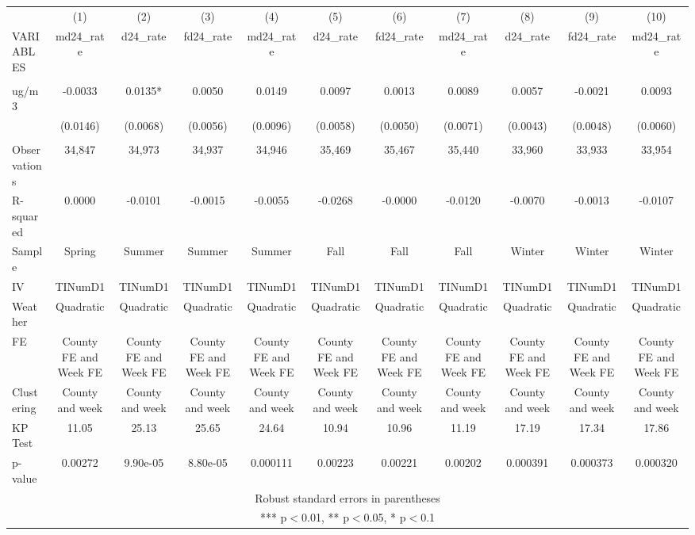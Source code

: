 \begin{tabular}{lcccccccccc} \hline
 & (1) & (2) & (3) & (4) & (5) & (6) & (7) & (8) & (9) & (10) \\
VARIABLES & md24\_rate & d24\_rate & fd24\_rate & md24\_rate & d24\_rate & fd24\_rate & md24\_rate & d24\_rate & fd24\_rate & md24\_rate \\ \hline
 &  &  &  &  &  &  &  &  &  &  \\
ug/m3 & -0.0033 & 0.0135* & 0.0050 & 0.0149 & 0.0097 & 0.0013 & 0.0089 & 0.0057 & -0.0021 & 0.0093 \\
 & (0.0146) & (0.0068) & (0.0056) & (0.0096) & (0.0058) & (0.0050) & (0.0071) & (0.0043) & (0.0048) & (0.0060) \\
 &  &  &  &  &  &  &  &  &  &  \\
Observations & 34,847 & 34,973 & 34,937 & 34,946 & 35,469 & 35,467 & 35,440 & 33,960 & 33,933 & 33,954 \\
R-squared & 0.0000 & -0.0101 & -0.0015 & -0.0055 & -0.0268 & -0.0000 & -0.0120 & -0.0070 & -0.0013 & -0.0107 \\
Sample & Spring & Summer & Summer & Summer & Fall & Fall & Fall & Winter & Winter & Winter \\
IV & TINumD1 & TINumD1 & TINumD1 & TINumD1 & TINumD1 & TINumD1 & TINumD1 & TINumD1 & TINumD1 & TINumD1 \\
Weather & Quadratic & Quadratic & Quadratic & Quadratic & Quadratic & Quadratic & Quadratic & Quadratic & Quadratic & Quadratic \\
FE & County FE and Week FE & County FE and Week FE & County FE and Week FE & County FE and Week FE & County FE and Week FE & County FE and Week FE & County FE and Week FE & County FE and Week FE & County FE and Week FE & County FE and Week FE \\
Clustering & County and week & County and week & County and week & County and week & County and week & County and week & County and week & County and week & County and week & County and week \\
KP Test & 11.05 & 25.13 & 25.65 & 24.64 & 10.94 & 10.96 & 11.19 & 17.19 & 17.34 & 17.86 \\
 p-value & 0.00272 & 9.90e-05 & 8.80e-05 & 0.000111 & 0.00223 & 0.00221 & 0.00202 & 0.000391 & 0.000373 & 0.000320 \\ \hline
\multicolumn{11}{c}{ Robust standard errors in parentheses} \\
\multicolumn{11}{c}{ *** p$<$0.01, ** p$<$0.05, * p$<$0.1} \\
\end{tabular}
